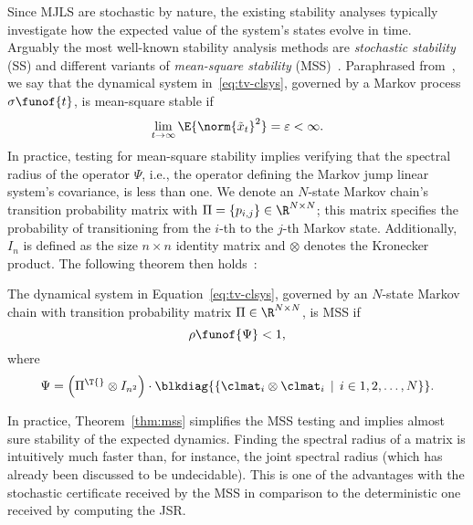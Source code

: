 Since MJLS are stochastic by nature, the existing stability analyses typically investigate how the expected value of the system's states evolve in time.
Arguably the most well-known stability analysis methods are \emph{stochastic stability} (SS) and different variants of \emph{mean-square stability} (MSS)~\cite{Feng:1992}.
Paraphrased from~\cite{Costa:2005}, we say that the dynamical system in~\eqref{eq:tv-clsys}, governed by a Markov process $\sigma\funof{t}$, is mean-square stable if
%
\begin{equation*}%
    \lim_{t\rightarrow \infty} \E{\norm{\tilde{x}_t}^2} = \varepsilon < \infty.
\end{equation*}
%
In practice, testing for mean-square stability implies verifying that the spectral radius of the operator $\Psi$, i.e., the operator defining the Markov jump linear system's covariance, is less than one.
We denote an $N$-state Markov chain's transition probability matrix with $\Pi = \left\{ p_{i,j} \right\} \in \R^{N \times N}$; this matrix specifies the probability of transitioning from the $i$-th to the $j$-th Markov state.
Additionally, $I_{n}$ is defined as the size $n \times n $ identity matrix and $\otimes$ denotes the Kronecker product.
The following theorem then holds~\cite{Costa:2005}:
%
\begin{theorem}%
    \label{thm:mss}%
    The dynamical system in Equation~\eqref{eq:tv-clsys}, governed by an $N$-state Markov chain with transition probability matrix $\Pi \in \R^{N \times N}$, is MSS if
    \begin{equation*}%
        \rho\funof{\Psi} < 1,
    \end{equation*}
    where
    \begin{equation*}%
        \Psi = \left( \Pi^\T{} \otimes I_{n^2} \right) \cdot \blkdiag{ \left\{ \clmat_i \otimes \clmat_i \, \mid \, i \in 1, 2, \ldots, N \right\} }.
    \end{equation*}
\end{theorem}
%
In practice, Theorem~\ref{thm:mss} simplifies the MSS testing and implies almost sure stability of the expected dynamics.
Finding the spectral radius of a matrix is intuitively much faster than, for instance, the joint spectral radius (which has already been discussed to be undecidable).
This is one of the advantages with the stochastic certificate received by the MSS in comparison to the deterministic one received by computing the JSR.



